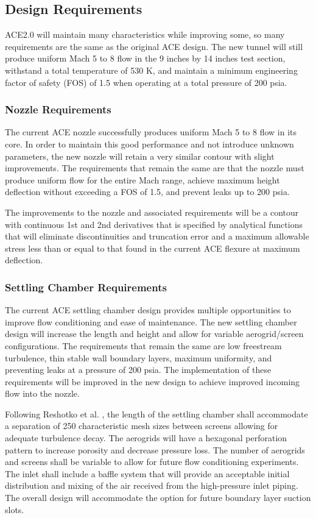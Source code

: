 \subsection{Design Requirements}

ACE2.0 will maintain many characteristics while improving some, so many requirements are the same as the original ACE design. The new tunnel will still produce uniform Mach 5 to 8 flow in the 9 inches by 14 inches test section, withstand a total temperature of 530 K, and maintain a minimum engineering factor of safety (FOS) of 1.5 when operating at a total pressure of 200 psia.

\subsubsection*{Nozzle Requirements}

The current ACE nozzle successfully produces uniform Mach 5 to 8 flow in its core. In order to maintain this good performance and not introduce unknown parameters, the new nozzle will retain a very similar contour with slight improvements. The requirements that remain the same are that the nozzle must produce uniform flow for the entire Mach range, achieve maximum height deflection without exceeding a FOS of 1.5, and prevent leaks up to 200 psia.

The improvements to the nozzle and associated requirements will be a contour with continuous 1st and 2nd derivatives that is specified by analytical functions that will eliminate discontinuities and truncation error and a maximum allowable stress less than or equal to that found in the current ACE flexure at maximum deflection.

\subsubsection*{Settling Chamber Requirements}

The current ACE settling chamber design provides multiple opportunities to improve flow conditioning and ease of maintenance. The new settling chamber design will increase the length and height and allow for variable aerogrid/screen configurations. The requirements that remain the same are low freestream turbulence, thin stable wall boundary layers, maximum uniformity, and preventing leaks at a pressure of 200 psia. The implementation of these requirements will be improved in the new design to achieve improved incoming flow into the nozzle.

Following Reshotko et al. \cite{reshotko}, the length of the settling chamber shall accommodate a separation of 250 characteristic mesh sizes between screens allowing for adequate turbulence decay. The aerogrids will have a hexagonal perforation pattern to increase porosity and decrease pressure loss. The number of aerogrids and screens shall be variable to allow for future flow conditioning experiments. The inlet shall include a baffle system that will provide an acceptable initial distribution and mixing of the air received from the high-pressure inlet piping. The overall design will accommodate the option for future boundary layer suction slots.


